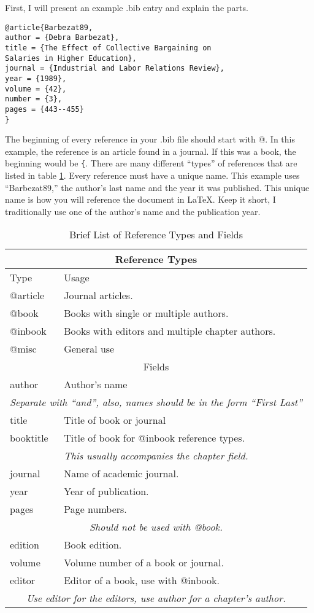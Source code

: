 \documentclass{article}
\begin{document}
First, I will present an example .bib entry and explain the parts.
\begin{verbatim}
@article{Barbezat89,
author = {Debra Barbezat},
title = {The Effect of Collective Bargaining on 
Salaries in Higher Education},
journal = {Industrial and Labor Relations Review},
year = {1989},
volume = {42},
number = {3},
pages = {443--455}
}
\end{verbatim}
The beginning of every reference in your .bib file should start with @. In this example, the reference is an article found in a journal. If this was a book, the beginning would be \texttt{\@book\{}. There are many different ``types'' of references that are listed in table \ref{tbl:reftypes}. Every reference must have a unique name. This example uses ``Barbezat89,'' the author's last name and the year it was published. This unique name is how you will reference the document in \LaTeX. Keep it short, I traditionally use one of the author's name and the publication year.

\begin{table}[!b]\caption{Brief List of Reference Types and Fields}\label{tbl:reftypes}
	\begin{tabular}{|l|l|}
	\hline
	\multicolumn{2}{|c|}{Reference Types} \\
	\hline 
	Type					& Usage \\
	\hline
	@article			& Journal articles. \\
	\hline
	@book					& Books with single or multiple authors. \\
	\hline
	@inbook				& Books with editors and multiple chapter authors. \\
	\hline
	@misc					& General use \\
	\hline
	\multicolumn{2}{|c|}{Fields} \\
	\hline
	author				& Author's name \\
	\multicolumn{2}{|l|}{\textit{Separate with ``and'', also, names should be in the form ``First Last''}} \\
	\hline
	title					& Title of book or journal \\
	\hline
	booktitle			& Title of book for @inbook reference types. \\
	\multicolumn{2}{|c|}{\textit{This usually accompanies the \emph{chapter} field.}} \\
	\hline
	journal				& Name of academic journal. \\
	\hline
	year					& Year of publication. \\
	\hline
	pages					& Page numbers. \\
	\multicolumn{2}{|c|}{\textit{Should not be used with \emph{@book}.}} \\
	edition				& Book edition. \\
	\hline
	volume				& Volume number of a book or journal. \\
	\hline
	editor				& Editor of a book, use with @inbook. \\
	\multicolumn{2}{|c|}{\textit{Use \emph{editor} for the editors, use \emph{author} for a chapter's author.}} \\
	\hline
	\end{tabular}
\end{table}
\end{document}
